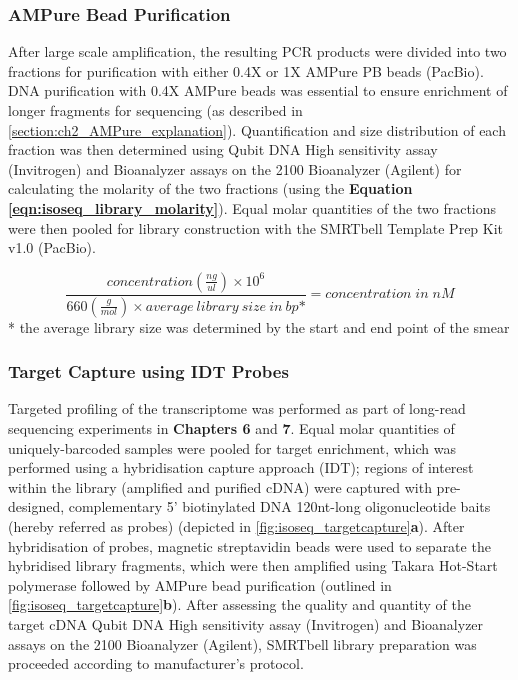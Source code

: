 \subsubsection{AMPure Bead Purification} 
\label{section:ch2_ampurebead_pool} 
After large scale amplification, the resulting PCR products were divided into two fractions for purification with either 0.4X or 1X AMPure PB beads (PacBio). DNA purification with 0.4X AMPure beads was essential to ensure enrichment of longer fragments for sequencing (as described in \cref{section:ch2_AMPure_explanation}). Quantification and size distribution of each fraction was then determined using Qubit DNA High sensitivity assay (Invitrogen) and Bioanalyzer assays on the 2100 Bioanalyzer (Agilent) for calculating the molarity of the two fractions (using the \textbf{Equation \ref{eqn:isoseq_library_molarity}}). Equal molar quantities of the two fractions were then pooled for library construction with the SMRTbell Template Prep Kit v1.0 (PacBio). 

\begin{equation}
	\label{eqn:isoseq_library_molarity}
	\frac{concentration(\frac{ng}{ul})\times 10^6}{660(\frac{g}{mol}) \times average\:library\:size\:in\:bp\mbox{*}} = concentration\;in\; nM
\end{equation}
* the average library size was determined by the start and end point of the smear

\subsubsection{Target Capture using IDT Probes} 
\label{section:ch2_targetcapture_explanation} 
Targeted profiling of the transcriptome was performed as part of long-read sequencing experiments in \textbf{Chapters 6} and \textbf{7}. Equal molar quantities of uniquely-barcoded samples were pooled for target enrichment, which was performed using a hybridisation capture approach (IDT); regions of interest within the library (amplified and purified cDNA) were captured with pre-designed, complementary 5’ biotinylated DNA 120nt-long oligonucleotide baits (hereby referred as probes) (depicted in \cref{fig:isoseq_targetcapture}\textbf{a}). After hybridisation of probes, magnetic streptavidin beads were used to separate the hybridised library fragments, which were then amplified using Takara Hot-Start polymerase followed by AMPure bead purification (outlined in \cref{fig:isoseq_targetcapture}\textbf{b}). After assessing the quality and quantity of the target cDNA  Qubit DNA High sensitivity assay (Invitrogen) and Bioanalyzer assays on the 2100 Bioanalyzer (Agilent), SMRTbell library preparation was proceeded according to manufacturer's protocol.  

